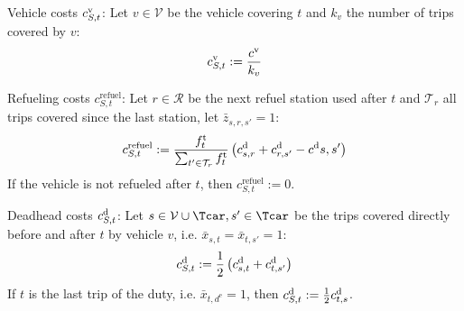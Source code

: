 \begin{definition}

Vehicle costs $c^{\operatorname{v}}_{S,t}$: Let $v\in\mathcal{V}$ be the vehicle covering $t$ and $k_v$ the number of trips covered by $v$:
\begin{equation}
	c^{\operatorname{v}}_{S,t} := \frac{c^{\operatorname{v}}}{k_v}
\end{equation}

Refueling costs $c^{\operatorname{refuel}}_{S,t}$: Let $r\in\mathcal{R}$ be the next refuel station used after $t$ and $\mathcal{T}_r$ all trips covered since the last station, let $\bar{z}_{s,r,s'} = 1$:
\begin{equation}
	c^{\operatorname{refuel}}_{S,t} := \frac{f^{\operatorname{t}}_t}{\sum_{t'\in\mathcal{T}_r} f^{\operatorname{t}}_t}\left(c^{\operatorname{d}}_{s,r}+c^{\operatorname{d}}_{r,s'}-c^{\operatorname{d}}{s,s'}\right)
\end{equation}
If the vehicle is not refueled after $t$, then $c^{\operatorname{refuel}}_{S,t} := 0$.

Deadhead costs $c^{\operatorname{d}}_{S,t}$: Let $s\in\mathcal{V}\cup\Tcar,s'\in\Tcar$ be the trips covered directly before and after $t$ by vehicle $v$, i.e. $\bar{x}_{s,t}=\bar{x}_{t,s'}=1$:
\begin{equation}
	c^{\operatorname{d}}_{S,t} := \frac 1 2 \left(c^{\operatorname{d}}_{s,t}+c^{\operatorname{d}}_{t,s'}\right)
\end{equation}
If $t$ is the last trip of the duty, i.e. $\bar{x}_{t,d^{\operatorname{e}}}=1$, then $c^{\operatorname{d}}_{S,t} := \frac 1 2 c^{\operatorname{d}}_{t,s}$.

\end{definition}